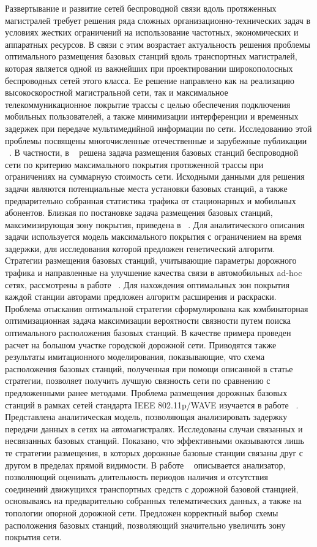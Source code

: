 Развертывание и развитие сетей беспроводной связи вдоль протяженных магистралей требует решения ряда сложных организационно-технических задач в условиях жестких ограничений на использование частотных, экономических и аппаратных ресурсов. В связи с этим возрастает актуальность решения проблемы оптимального размещения базовых станций вдоль транспортных магистралей, которая является одной из важнейших при проектировании широкополосных беспроводных сетей этого класса. Ее решение направлено как на реализацию высокоскоростной магистральной сети, так и максимальное телекоммуникационное покрытие трассы с целью обеспечения подключения мобильных пользователей, а также минимизации интерференции и временных задержек при передаче мультимедийной информации по сети.
Исследованию этой проблемы посвящены многочисленные отечественные и зарубежные публикации ~\cite{Conference1, Conference2, Liu, Reis, Lee1, Lee2, Xie, Wu}. В частности, в ~\cite{Conference1} решена задача размещения базовых станций беспроводной сети по критерию максимального покрытия протяженной трассы при ограничениях на суммарную стоимость сети. Исходными данными для решения задачи являются потенциальные места установки базовых станций, а также предварительно собранная статистика трафика от стационарных и мобильных абонентов. Близкая по постановке задача размещения базовых станций, максимизирующая зону покрытия, приведена в ~\cite{Conference2}. Для аналитического описания задачи используется модель максимального покрытия с ограничением на время задержки, для исследования которой предложен генетический алгоритм.
Стратегии размещения базовых станций, учитывающие параметры дорожного трафика и направленные на улучшение качества связи в автомобильных ad-hoc сетях, рассмотрены в работе ~\cite{Liu}. Для нахождения оптимальных зон покрытия каждой станции авторами предложен алгоритм расширения и раскраски. Проблема отыскания оптимальной стратегии сформулирована как комбинаторная оптимизационная задача максимизации вероятности связности путем поиска оптимального расположения базовых станций. В качестве примера проведен расчет на большом участке городской дорожной сети. Приводятся также результаты имитационного моделирования, показывающие, что схема расположения базовых станций, полученная при помощи описанной в статье стратегии, позволяет получить лучшую связность сети по сравнению с предложенными ранее методами.
Проблема размещения дорожных базовых станций в рамках сетей стандарта IEEE 802.11p/WAVE изучается в работе ~\cite{Liu}. Представлена аналитическая модель, позволяющая анализировать задержку передачи данных в сетях на автомагистралях. Исследованы случаи связанных и несвязанных базовых станций. Показано, что эффективными оказываются лишь те стратегии размещения, в которых дорожные базовые станции связаны друг с другом в пределах прямой видимости. В работе ~\cite{Lee1} описывается анализатор, позволяющий оценивать длительность периодов наличия и отсутствия соединений движущихся транспортных средств с дорожной базовой станцией, основываясь на предварительно собранных телематических данных, а также на топологии опорной дорожной сети. Предложен корректный выбор схемы расположения базовых станций, позволяющий значительно увеличить зону покрытия сети. 
